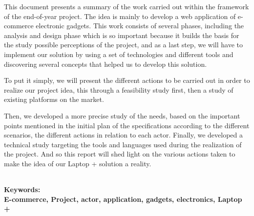\documentclass[a4paper,12pt]{report}
\begin{document}
\begin{doublespace}
This document presents a summary of the work carried out within the framework of the end-of-year project. The idea is mainly to develop a web application of e-commerce electronic gadgets. This work consists of several phases, including the analysis and design phase which is so important because it builds the basis for the study
possible perceptions of the project, and as a last step, we will have to implement our solution by
using a set of technologies and different tools and discovering several concepts that helped us to develop this solution.

To put it simply, we will present the different actions to be carried out in order to realize our project idea, this through a feasibility study first, then a study of existing platforms on the market.

Then, we developed a more precise study of the needs, based on the important points mentioned in the initial plan of the specifications according to the different scenarios, the different actions in relation to each actor.
Finally, we developed a technical study targeting the tools and languages used during the realization of the project.
And so this report will shed light on the various actions taken to make the idea of  our Laptop + solution a reality.







\textbf{\\Keywords:\\E-commerce, Project, actor, application, gadgets, electronics, Laptop +}


\end{doublespace}

\newpage

\renewcommand{\contentsname}{Table de matières}
\setcounter{tocdepth}{4}
\tableofcontents

\cleardoublepage
{}
\listoffigures
\end{document}
